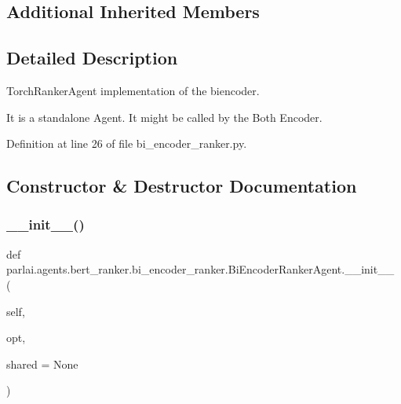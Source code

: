 \subsection*{Additional Inherited Members}


\subsection{Detailed Description}
\begin{DoxyVerb}TorchRankerAgent implementation of the biencoder.

It is a standalone Agent. It might be called by the Both Encoder.
\end{DoxyVerb}
 

Definition at line 26 of file bi\+\_\+encoder\+\_\+ranker.\+py.



\subsection{Constructor \& Destructor Documentation}
\mbox{\label{classparlai_1_1agents_1_1bert__ranker_1_1bi__encoder__ranker_1_1BiEncoderRankerAgent_a353144d4f4c3182774913c4ddba33de9}} 
\subsubsection{\texorpdfstring{\+\_\+\+\_\+init\+\_\+\+\_\+()}{\_\_init\_\_()}}
{\footnotesize\ttfamily def parlai.\+agents.\+bert\+\_\+ranker.\+bi\+\_\+encoder\+\_\+ranker.\+Bi\+Encoder\+Ranker\+Agent.\+\_\+\+\_\+init\+\_\+\+\_\+ (\begin{DoxyParamCaption}\item[{}]{self,  }\item[{}]{opt,  }\item[{}]{shared = {\ttfamily None} }\end{DoxyParamCaption})}



